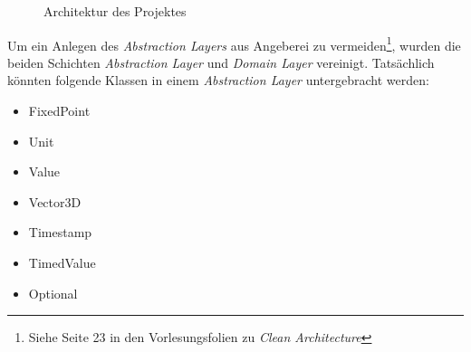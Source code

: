 \begin{figure}[ht!]
\vspace{0.25cm}
\begin{center}
\caption{Architektur des Projektes}
\label{fig:Arch}
\end{center}

\vspace{0.25cm}
\end{figure}





Um ein Anlegen des \textit{Abstraction Layers} aus Angeberei zu vermeiden\footnote{Siehe Seite 23 in den Vorlesungsfolien zu \textit{Clean Architecture}}, wurden die beiden Schichten \textit{Abstraction Layer} und \textit{Domain Layer} vereinigt. Tatsächlich könnten folgende Klassen in einem \textit{Abstraction Layer} untergebracht werden:
\begin{itemize}
\item FixedPoint
\item Unit
\item Value
\item Vector3D
\item Timestamp
\item TimedValue 
\item Optional
\end{itemize}

